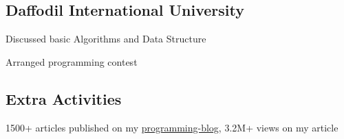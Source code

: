 \documentclass[]{deedy-resume-openfont}
\begin{document}
\begin{minipage}[t]{0.34\textwidth}
\subsection{Daffodil International University}
\vspace{\topsep}
\begin{tightemize}
\item Discussed basic Algorithms and Data Structure
\item Arranged programming contest
\end{tightemize}
\sectionsep

\subsection{Extra Activities}
1500+ articles published on my \href{http://programming-jinnatul.blogspot.com/}{programming-blog}, 3.2M+ views on my article
\sectionsep

%
%

\end{minipage} 
\hfill
\end{document}
